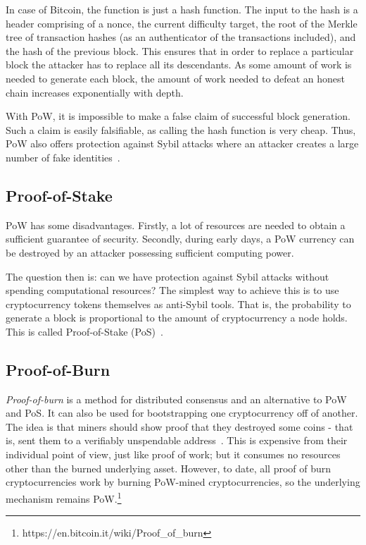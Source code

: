 \documentclass[]{report}   %
\newcommand{\authnote}[2]{\marginpar{\parbox{\marginparwidth}{\tiny %
  \textsf{#1 {\textcolor{blue}{notes: #2}}}}}%
  \textcolor{blue}{\textbf{\dag}}}
\newcommand{\authnote}[2]{
  \textsf{#1 \textcolor{blue}{: #2}}}
\newcommand{\authnote}[2]{}
\newcommand{\knote}[1]{{\authnote{\textcolor{green}{Alex notes}}{#1}}}
\begin{document}
In case of Bitcoin, the function is just a hash function. The input to the hash is a header comprising of a nonce, the current difficulty target, the root of the Merkle tree of transaction hashes (as an authenticator of the transactions included), and the hash of the previous block. This ensures that in order to replace a particular block the attacker has to replace all its descendants. As some amount of work is needed to generate each block, the amount of work needed to defeat an honest chain increases exponentially with depth.

With PoW, it is impossible to make a false claim of successful block generation. Such a claim is easily falsifiable, as calling the hash function is very cheap. Thus, PoW also offers protection against Sybil attacks where an attacker creates a large number of fake identities~\cite{douceur2002sybil}.

\subsection{Proof-of-Stake}

PoW has some disadvantages. Firstly, a lot of resources are needed to obtain a sufficient guarantee of security. Secondly, during early days, a PoW currency can be destroyed by an attacker possessing sufficient computing power. 

The question then is: can we have protection against Sybil attacks without spending computational resources? 
The simplest way to achieve this is to use cryptocurrency tokens themselves as anti-Sybil tools. 
That is, the probability to generate a block is proportional to the amount of cryptocurrency a node holds. This is called Proof-of-Stake (PoS)~\cite{kiayias2016provably,king2012ppcoin}.

\subsection{Proof-of-Burn}

{\em Proof-of-burn} is a method for distributed consensus and an alternative to PoW and PoS. It can also be used for bootstrapping one cryptocurrency off of another.
The idea is that miners should show proof that they destroyed some coins - that is, sent them to a verifiably unspendable address~\cite{stewart2012proof}. This is expensive from their individual point of view, just like proof of work; but it consumes no resources other than the burned underlying asset. However, to date, all proof of burn cryptocurrencies work by burning PoW-mined cryptocurrencies, so the underlying mechanism remains PoW.\footnote{https://en.bitcoin.it/wiki/Proof\_of\_burn}
\end{document}
